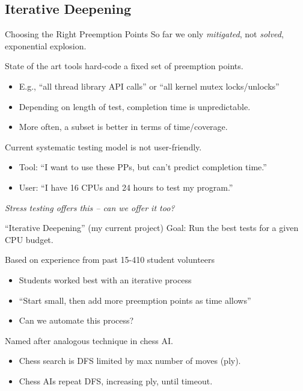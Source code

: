 \documentclass[xcolor=dvipsnames]{beamer}
\begin{document}

\subsection{Iterative Deepening}

\begin{frame}{Choosing the Right Preemption Points}
	So far we only {\em mitigated}, not {\em solved}, exponential explosion.
	\pause
	\linegap

	State of the art tools hard-code a fixed set of preemption points.
	\begin{itemize}
		\item E.g., ``all thread library API calls'' or ``all kernel mutex locks/unlocks''
		\item Depending on length of test, completion time is unpredictable.
		\item More often, a subset is better in terms of time/coverage. 
	\end{itemize}
	\pause
	\linegap
	Current systematic testing model is not user-friendly.
	\begin{itemize}
		\item Tool: ``I want to use these PPs, but can't predict completion time.''
		\item User: ``I have 16 CPUs and 24 hours to test my program.''
	\end{itemize}
	\linegap
	{\em Stress testing offers this -- can we offer it too?}
\end{frame}

\begin{frame}{``Iterative Deepening'' (my current project)}
	Goal: Run the best tests for a given CPU budget.
	\linegap

	Based on experience from past 15-410 student volunteers
	\begin{itemize}
		\item Students worked best with an iterative process
		\item ``Start small, then add more preemption points as time allows''
		\item Can we automate this process?
	\end{itemize}
	\linegap

	Named after analogous technique in chess AI.
	\begin{itemize}
		\item Chess search is DFS limited by max number of moves (ply).
		\item Chess AIs repeat DFS, increasing ply, until timeout.
	\end{itemize}
\end{frame}
\end{document}

